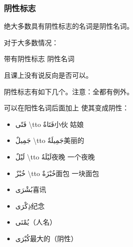 \subsubsection{阴性标志}

绝大多数具有阴性标志的名词是阴性名词。

\begin{note}
    对于大多数情况：
    
    \begin{center}
        带有阴性标志 \tto 阴性名词
    \end{center}

    且课上没有说反向是否可以。
\end{note}

阴性标志有如下几个。注意：全都有例外。

\begin{description}
    \item[] 
\end{description}

可以在阳性名词后面加上  使其变成阴性：

\begin{multicols}{2}
    \begin{itemize}
        \item \ac{فَتًى \tto فَتَاةٌ}{小伙 \tto 姑娘}
        \item \ac{جَمِيلٌ \tto جَمِيلَةٌ}{美丽的}
        \item \ac{لَيْلٌ \tto لَيْلَةٌ}{夜晚 \tto 一个夜晚}
        \item \ac{خُبْزٌ \tto خُبْزَةٌ}{面包 \tto 一块面包}
    \end{itemize}
\end{multicols}

\begin{description}
    \item[] 
\end{description}

\begin{multicols}{2}
    \begin{itemize}
        \item \ac{بُشْرَى}{喜讯}
        \item \ac{ذِكْرَى}{纪念}
        \item \ac{يُمْنَى}{（人名）}
        \item \ac{كُبْرَى}{最大的（阴性）}
    \end{itemize}
\end{multicols}

\begin{description}
    \item[] 
\end{description}

